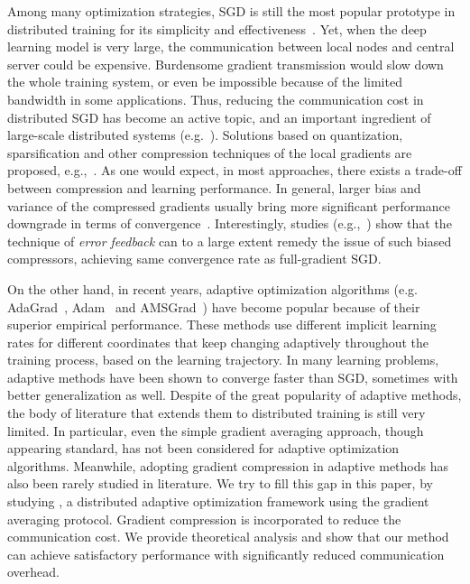 \documentclass[11pt]{article}
\begin{document}
Among many optimization strategies, SGD is still the most popular prototype in distributed training for its simplicity and effectiveness~\cite{chilimbi2014project,Proc:Agrawal_NIPS19,mikami2018massively}. Yet, when the deep learning model is very large, the communication between local nodes and central server could be expensive. Burdensome gradient transmission would slow down the whole training system, or even be impossible because of the limited bandwidth in some applications. Thus, reducing the communication cost in distributed SGD has become an active topic, and an important ingredient of large-scale distributed systems (e.g.~\cite{Proc:Seide14}). Solutions based on quantization, sparsification and other compression techniques of the local gradients are proposed, e.g.,~\cite{alistarh2017qsgd,wen2017terngrad,wangni2018gradient,stich2018sparsified,aji2017sparse,bernstein2018signsgd,de2017understanding,yang2019swalp,Proc:Ivkin_NIPS19}. As one would expect, in most approaches, there exists a trade-off between compression and learning performance. In general, larger bias and variance of the compressed gradients usually bring more significant performance downgrade in terms of convergence~\cite{stich2018sparsified,ajalloeian2020analysis}. Interestingly, studies (e.g.,~\cite{karimireddy2019error}) show that the technique of \textit{error feedback} can to a large extent remedy the issue of such biased compressors, achieving same convergence rate as full-gradient SGD.


On the other hand, in recent years, adaptive optimization algorithms (e.g. AdaGrad~\cite{Duchi10-adagrad}, Adam~\cite{kingma2014adam} and AMSGrad~\cite{reddi2019convergence}) have become popular because of their superior empirical performance. These methods use different implicit learning rates for different coordinates that keep changing adaptively throughout the training process, based on the learning trajectory. In many learning problems, adaptive methods have been shown to converge faster than SGD, sometimes with better generalization as well. Despite of the great popularity of adaptive methods, the body of literature that extends them to distributed training is still very limited. In particular, even the simple gradient averaging approach, though appearing standard, has not been considered for adaptive optimization algorithms. Meanwhile, adopting gradient compression in adaptive methods has also been rarely studied in literature. We try to fill this gap in this paper, by studying \algo , a distributed adaptive optimization framework using the gradient averaging protocol. Gradient compression is incorporated to reduce the communication cost. We provide theoretical analysis and show that our method can achieve satisfactory performance with significantly reduced communication overhead. 
\end{document}
